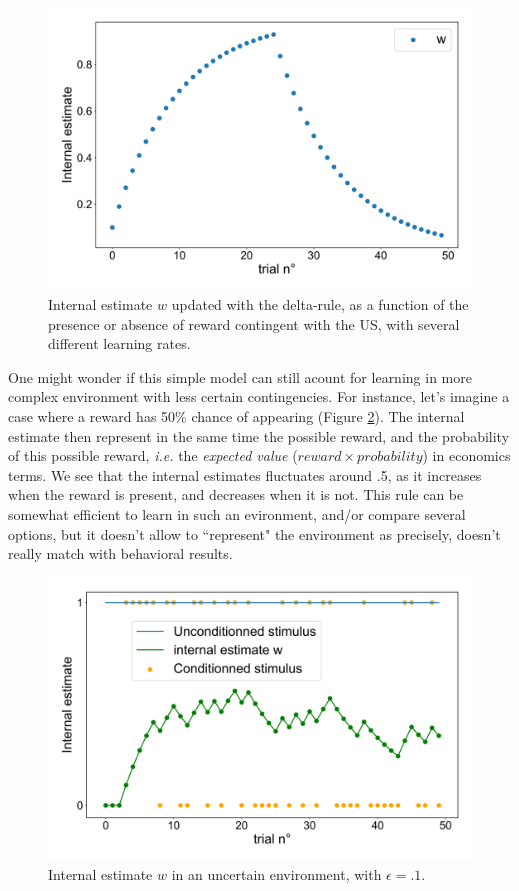 \documentclass{article}
\begin{document}
\begin{figure}[H]
\centering
\includegraphics[width=.8\linewidth]{fig2_report3.png}
\caption[growing population]{Internal estimate $w$ updated with the delta-rule, as a function of the presence or absence of reward contingent with the US, with several different learning rates.}\label{fig:fig2}
\end{figure}

One might wonder if this simple model can still acount for learning in more complex environment with less certain contingencies. For instance, let's imagine a case where a reward has 50\% chance of appearing (Figure \ref{fig:fig3}). The internal estimate then represent in the same time the possible reward, and the probability of this possible reward, \textit{i.e.} the \textit{expected value} ($reward \times probability$) in economics terms. We see that the internal estimates fluctuates around .5, as it increases when the reward is present, and decreases when it is not. This rule can be somewhat efficient to learn in such an evironment, and/or compare several options, but it doesn't allow to ``represent" the environment as precisely, doesn't really match with behavioral results.

\begin{figure}[H]
\centering
\includegraphics[width=.8\linewidth]{fig2_report5.png}
\caption[growing population]{Internal estimate $w$ in an uncertain environment, with $\epsilon = .1$.}\label{fig:fig3}
\end{figure}
\end{document}
